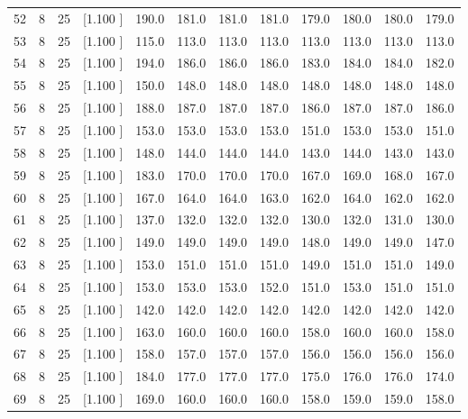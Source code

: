 \documentclass[12pt,a4paper]{article}
\begin{document}
\begin{center}
{\begin{tabular}{r r r r r r r r r r r r}
  52&  8& 25&[1.100     ]&   190.0&   181.0&   181.0&   181.0&   179.0&   180.0&   180.0&   179.0\\[-0.02in]
  53&  8& 25&[1.100     ]&   115.0&   113.0&   113.0&   113.0&   113.0&   113.0&   113.0&   113.0\\[-0.02in]
  54&  8& 25&[1.100     ]&   194.0&   186.0&   186.0&   186.0&   183.0&   184.0&   184.0&   182.0\\[-0.02in]
  55&  8& 25&[1.100     ]&   150.0&   148.0&   148.0&   148.0&   148.0&   148.0&   148.0&   148.0\\[-0.02in]
  56&  8& 25&[1.100     ]&   188.0&   187.0&   187.0&   187.0&   186.0&   187.0&   187.0&   186.0\\[-0.02in]
  57&  8& 25&[1.100     ]&   153.0&   153.0&   153.0&   153.0&   151.0&   153.0&   153.0&   151.0\\[-0.02in]
  58&  8& 25&[1.100     ]&   148.0&   144.0&   144.0&   144.0&   143.0&   144.0&   143.0&   143.0\\[-0.02in]
  59&  8& 25&[1.100     ]&   183.0&   170.0&   170.0&   170.0&   167.0&   169.0&   168.0&   167.0\\[-0.02in]
  60&  8& 25&[1.100     ]&   167.0&   164.0&   164.0&   163.0&   162.0&   164.0&   162.0&   162.0\\[-0.02in]
  61&  8& 25&[1.100     ]&   137.0&   132.0&   132.0&   132.0&   130.0&   132.0&   131.0&   130.0\\[-0.02in]
  62&  8& 25&[1.100     ]&   149.0&   149.0&   149.0&   149.0&   148.0&   149.0&   149.0&   147.0\\[-0.02in]
  63&  8& 25&[1.100     ]&   153.0&   151.0&   151.0&   151.0&   149.0&   151.0&   151.0&   149.0\\[-0.02in]
  64&  8& 25&[1.100     ]&   153.0&   153.0&   153.0&   152.0&   151.0&   153.0&   151.0&   151.0\\[-0.02in]
  65&  8& 25&[1.100     ]&   142.0&   142.0&   142.0&   142.0&   142.0&   142.0&   142.0&   142.0\\[-0.02in]
  66&  8& 25&[1.100     ]&   163.0&   160.0&   160.0&   160.0&   158.0&   160.0&   160.0&   158.0\\[-0.02in]
  67&  8& 25&[1.100     ]&   158.0&   157.0&   157.0&   157.0&   156.0&   156.0&   156.0&   156.0\\[-0.02in]
  68&  8& 25&[1.100     ]&   184.0&   177.0&   177.0&   177.0&   175.0&   176.0&   176.0&   174.0\\[-0.02in]
  69&  8& 25&[1.100     ]&   169.0&   160.0&   160.0&   160.0&   158.0&   159.0&   159.0&   158.0\\[-0.02in]

\end{tabular}}
\end{center}
\end{document}
